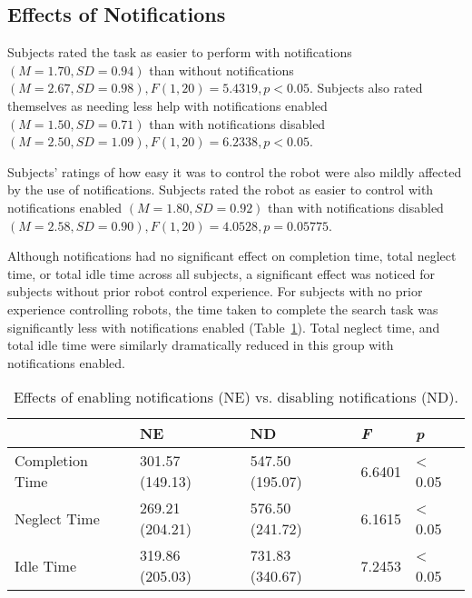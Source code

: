 \subsection{Effects of Notifications} %
\label{sub:effects_of_notifications}
Subjects rated the task as easier to perform with notifications $(M=1.70, SD=0.94)$ than without notifications $(M=2.67, SD=0.98), F(1,20)=5.4319, p<0.05$. Subjects also rated themselves as needing less help with notifications enabled $(M=1.50, SD=0.71)$ than with notifications disabled $(M=2.50, SD=1.09), F(1,20)=6.2338, p<0.05$.

Subjects’ ratings of how easy it was to control the robot were also mildly affected by the use of notifications. Subjects rated the robot as easier to control with notifications enabled $(M=1.80, SD=0.92)$ than with notifications disabled $(M=2.58, SD=0.90), F(1,20)=4.0528, p=0.05775$.

Although notifications had no significant effect on completion time, total neglect time, or total idle time across all subjects, a significant effect was noticed for subjects without prior robot control experience. For subjects with no prior experience controlling robots, the time taken to complete the search task was significantly less with notifications enabled (Table~\ref{tab:notifications}). Total neglect time, and total idle time were similarly dramatically reduced in this group with notifications enabled.


\begin{table}[ht]
\label{tab:notifications}
\begin{center}
	\begin{tabular}{| l | l | l | l | l |}
	\hline
		& \textbf{NE} & \textbf{ND} & \emph{F} & \emph{p}\\ \hline
		Completion Time & 301.57 (149.13) & 547.50 (195.07) & 6.6401 & < 0.05\\ \hline
		Neglect Time & 269.21 (204.21) & 576.50 (241.72) & 6.1615 & < 0.05\\ \hline
		Idle Time & 319.86 (205.03) & 731.83 (340.67) & 7.2453 & < 0.05\\ \hline
	\hline
	\end{tabular}
	\caption{Effects of enabling notifications (NE) vs. disabling notifications (ND).}
\end{center}
\end{table}

